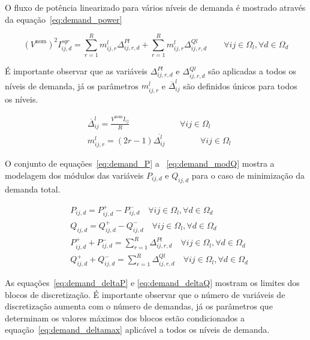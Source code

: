 O fluxo de potência linearizado para vários níveis de demanda é mostrado através da equação~\eqref{eq:demand_power}

\begin{equation}\label{eq:demand_power}
    (V^{\text{nom}})^{2}I_{ij,d}^{sqr} = \sum_{r = 1}^{R}m_{ij,r}^{l}\Delta_{ij,r,d}^{Pl} + \sum_{r = 1}^{R}m_{ij,r}^{l}\Delta_{ij,r,d}^{Ql}\qquad\forall ij\in\Omega_l,\forall d\in\Omega_d
\end{equation}

É importante observar que as variáveis $\Delta_{ij,r,d}^{Pl}$ e $\Delta_{ij,r,d}^{Ql}$ são aplicadas a todos os níveis de demanda, já os parâmetros $m_{ij,r}^{l}$ e $\overline{\Delta}_{ij}^{l}$ são definidos únicos para todos os níveis.

\begin{align}\label{eq:demand_deltamax}
    &\overline{\Delta}_{ij}^{l} = \frac{V^{\text{nom}}\overline{I}_{ij}}{R} \qquad\qquad\qquad\forall ij\in\Omega_{l}\\
    \label{eq:demand_coefangular}
    &m_{ij,r}^{l} = (2r-1)\overline{\Delta_{ij}^{l}}\qquad\qquad\,\forall ij\in\Omega_{l} 
\end{align}

O conjunto de equações~\eqref{eq:demand_P} a ~\eqref{eq:demand_modQ} mostra a modelagem dos módulos das variáveis $P_{ij,d}$ e $Q_{ij,d}$ para o caso de minimização da demanda total.

\begin{align}
    &P_{ij,d} = P_{ij,d}^{+} - P_{ij,d}^{-}\quad\forall ij \in\Omega_{l},\forall d\in\Omega_d\label{eq:demand_Pmod}\\
    &Q_{ij,d} = Q_{ij,d}^{+} - Q_{ij,d}^{-}\quad\forall ij \in\Omega_{l},\forall d\in\Omega_d\label{eq:demand_Qmod}\\
    &P_{ij,d}^{+} + P_{ij,d}^{-} = \sum_{r = 1}^{R}\Delta_{ij,r,d}^{Pl}\quad\forall ij \in\Omega_{l},\forall d\in\Omega_d\label{eq:demand_modP}\\
    &Q_{ij,d}^{+} + Q_{ij,d}^{-} = \sum_{r = 1}^{R}\Delta_{ij,r,d}^{Ql}\quad\forall ij \in\Omega_{l},\forall d\in\Omega_d\label{eq:demand_modQ}
\end{align}

As equações~\eqref{eq:demand_deltaP} e \eqref{eq:demand_deltaQ} mostram os limites dos blocos de discretização.
É importante observar que o número de variáveis de discretização aumenta com o número de demandas, já os parâmetros que determinam os valores máximos dos blocos estão condicionados a equação~\eqref{eq:demand_deltamax} aplicável a todos os níveis de demanda.

